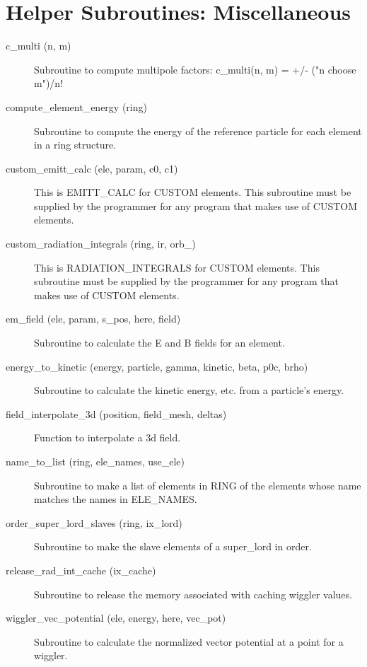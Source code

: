 \section{Helper Subroutines: Miscellaneous}
\label{r:misc_help}

\begin{description}

\item[c\_multi (n, m)] \Newline
Subroutine to compute multipole factors: c\_multi(n, m) = +/- ("n choose m")/n! 

\item[compute\_element\_energy (ring)] \Newline
Subroutine to compute the energy of the reference particle for each element in a ring structure. 

\item[custom\_emitt\_calc (ele, param, c0, c1)] \Newline
This is EMITT\_CALC for CUSTOM elements. This subroutine must be supplied 
by the programmer for any program that makes use of CUSTOM elements. 

\item[custom\_radiation\_integrals (ring, ir, orb\_)] \Newline
This is RADIATION\_INTEGRALS for CUSTOM elements. This subroutine must be 
supplied by the programmer for any program that makes use of CUSTOM elements. 

\item[em\_field (ele, param, s\_pos, here, field)] \Newline
Subroutine to calculate the E and B fields for an element. 

\item[energy\_to\_kinetic (energy, particle, gamma, kinetic, beta, p0c, brho)] \Newline
Subroutine to calculate the kinetic energy, etc. from a particle's energy. 

\item[field\_interpolate\_3d (position, field\_mesh, deltas)] \Newline
Function to interpolate a 3d field. 

\item[name\_to\_list (ring, ele\_names, use\_ele)] \Newline
Subroutine to make a list of elements in RING of the elements 
whose name matches the names in ELE\_NAMES. 

\item[order\_super\_lord\_slaves (ring, ix\_lord)] \Newline
Subroutine to make the slave elements of a super\_lord in order. 

\item[release\_rad\_int\_cache (ix\_cache)] \Newline 
     Subroutine to release the memory associated with caching wiggler values.

\item[wiggler\_vec\_potential (ele, energy, here, vec\_pot)] \Newline
Subroutine to calculate the normalized vector potential at a point for a wiggler.

\end{description}

